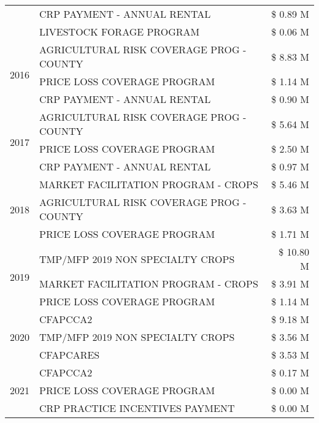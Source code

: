 \begin{tabular}{llr}
 & CRP PAYMENT - ANNUAL RENTAL & \$ 0.89 M \\
 & LIVESTOCK FORAGE PROGRAM & \$ 0.06 M \\
\cline{1-3}
\multirow[t]{3}{*}{2016} & AGRICULTURAL RISK COVERAGE PROG - COUNTY & \$ 8.83 M \\
 & PRICE LOSS COVERAGE PROGRAM & \$ 1.14 M \\
 & CRP PAYMENT - ANNUAL RENTAL & \$ 0.90 M \\
\cline{1-3}
\multirow[t]{3}{*}{2017} & AGRICULTURAL RISK COVERAGE PROG - COUNTY & \$ 5.64 M \\
 & PRICE LOSS COVERAGE PROGRAM & \$ 2.50 M \\
 & CRP PAYMENT - ANNUAL RENTAL & \$ 0.97 M \\
\cline{1-3}
\multirow[t]{3}{*}{2018} & MARKET FACILITATION PROGRAM - CROPS & \$ 5.46 M \\
 & AGRICULTURAL RISK COVERAGE PROG - COUNTY & \$ 3.63 M \\
 & PRICE LOSS COVERAGE PROGRAM & \$ 1.71 M \\
\cline{1-3}
\multirow[t]{3}{*}{2019} & TMP/MFP 2019 NON SPECIALTY CROPS & \$ 10.80 M \\
 & MARKET FACILITATION PROGRAM - CROPS & \$ 3.91 M \\
 & PRICE LOSS COVERAGE PROGRAM & \$ 1.14 M \\
\cline{1-3}
\multirow[t]{3}{*}{2020} & CFAPCCA2 & \$ 9.18 M \\
 & TMP/MFP 2019 NON SPECIALTY CROPS & \$ 3.56 M \\
 & CFAPCARES & \$ 3.53 M \\
\cline{1-3}
\multirow[t]{3}{*}{2021} & CFAPCCA2 & \$ 0.17 M \\
 & PRICE LOSS COVERAGE PROGRAM & \$ 0.00 M \\
 & CRP PRACTICE INCENTIVES PAYMENT & \$ 0.00 M \\
\cline{1-3}
\bottomrule
\end{tabular}
